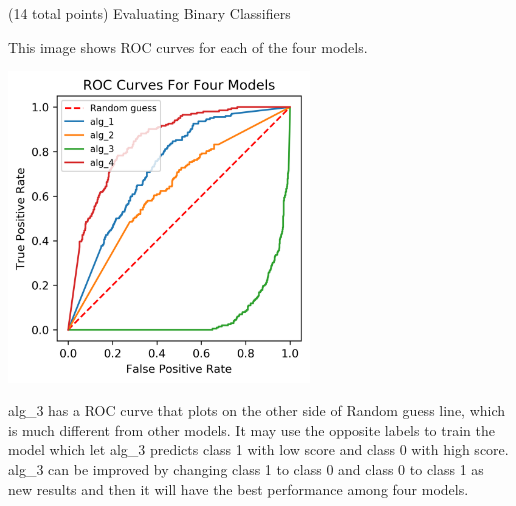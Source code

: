 \documentclass[12pt]{article}
\begin{document}
\begin{question}{(14 total points) Evaluating Binary Classifiers}
\begin{subquestion}
\begin{answerbox}{35em}
This image shows ROC curves for each of the four models.
\begin{center}
\includegraphics[width=0.6\textwidth]{ROC.png}
\end{center}
alg\_3 has a ROC curve that plots on the other side of Random guess line, which is much different from other models. It may use the opposite labels to train the model which let alg\_3 predicts class 1 with low score and class 0 with high score. alg\_3 can be improved by changing class 1 to class 0 and class 0 to class 1 as new results and then it will have the best performance among four models.
\end{answerbox}



\end{subquestion}

\end{question}
\end{document}
